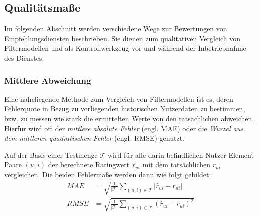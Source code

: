 \subsection{Qualitätsmaße}\label{sec:measures}
%
%

Im folgenden Abschnitt werden verschiedene Wege zur Bewertungen von Empfehlungsdiensten beschrieben. Sie dienen zum qualitativen Vergleich von Filtermodellen und als Kontrollwerkzeug vor und während der Inbetriebnahme des Dienstes.

\subsubsection{Mittlere Abweichung} \label{sec:qa_rmse}

Eine naheliegende Methode zum Vergleich von Filtermodellen ist es, deren Fehlerquote in Bezug zu vorliegenden historischen Nutzerdaten zu bestimmen, bzw. zu messen wie stark die ermittelten Werte von den tatsächlichen abweichen. Hierfür wird oft der \textit{mittlere absolute Fehler} (engl. \acf{MAE}) oder die \textit{Wurzel aus dem mittleren quadratischen Fehler} (engl. \acf{RMSE}) genutzt.

Auf der Basis einer Testmenge $\mathcal{T}$ wird für alle darin befindlichen Nutzer-Element-Paare $(u,i)$ der berechnete Ratingwert $\hat{r}_{ui}$ mit dem tatsächlichen $r_{ui}$ vergleichen. Die beiden Fehlermaße werden dann wie folgt gebildet:
\begin{align}
MAE & = \sqrt{\frac{1}{|\mathcal{T}|} \sum_{(u,i) \in \mathcal{T}}{|\hat{r}_{ui}-r_{ui}|}} \label{form:mae} \\
RMSE & = \sqrt{\frac{1}{|\mathcal{T}|} \sum_{(u,i) \in \mathcal{T}}{(\hat{r}_{ui}-r_{ui})^2}} \label{form:rmse}
\end{align}

